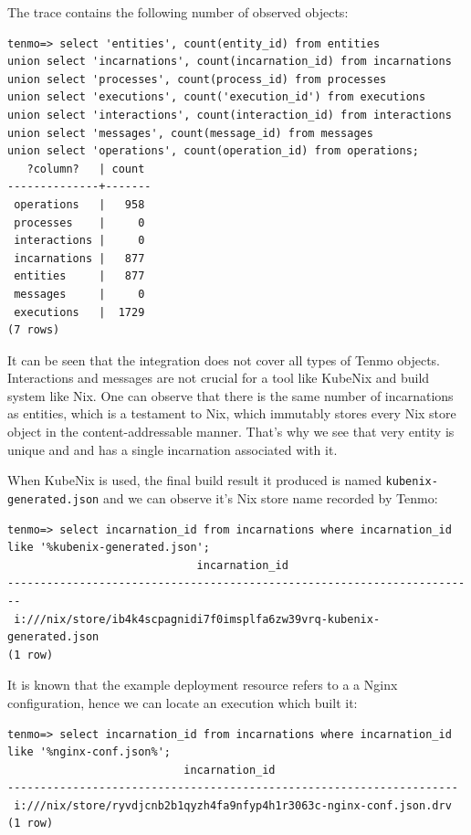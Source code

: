 The trace contains the following number of observed objects:
%
\begin{verbatim}
tenmo=> select 'entities', count(entity_id) from entities      
union select 'incarnations', count(incarnation_id) from incarnations
union select 'processes', count(process_id) from processes     
union select 'executions', count('execution_id') from executions
union select 'interactions', count(interaction_id) from interactions
union select 'messages', count(message_id) from messages
union select 'operations', count(operation_id) from operations;
   ?column?   | count 
--------------+-------
 operations   |   958
 processes    |     0
 interactions |     0
 incarnations |   877
 entities     |   877
 messages     |     0
 executions   |  1729
(7 rows)
\end{verbatim}

It can be seen that the integration does not cover all types of Tenmo objects. Interactions and messages are not crucial for a tool like KubeNix and build system like Nix. One can observe that there is the same number of incarnations as entities, which is a testament to Nix, which immutably stores every Nix store object in the content-addressable manner. That's why we see that very entity is unique and and has a single incarnation associated with it.

When KubeNix is used, the final build result it produced is named \texttt{kubenix-generated.json} and we can observe it's Nix store name recorded by Tenmo:
%
\begin{verbatim}
tenmo=> select incarnation_id from incarnations where incarnation_id like '%kubenix-generated.json';
                             incarnation_id                             
------------------------------------------------------------------------
 i:///nix/store/ib4k4scpagnidi7f0imsplfa6zw39vrq-kubenix-generated.json
(1 row)
\end{verbatim}

It is known that the example deployment resource refers to a a Nginx configuration, hence we can locate an execution which built it:
\begin{verbatim}
tenmo=> select incarnation_id from incarnations where incarnation_id like '%nginx-conf.json%';
                           incarnation_id                            
---------------------------------------------------------------------
 i:///nix/store/ryvdjcnb2b1qyzh4fa9nfyp4h1r3063c-nginx-conf.json.drv
(1 row)
\end{verbatim}

